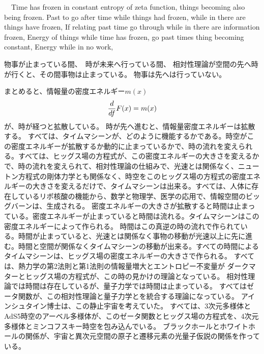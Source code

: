 \documentclass{jsarticle}
\begin{document}
\title{}
\author{}
\date{}
\maketitle
　Time has frozen in constant entropy of zeta function, things becoming also being frozen.
Past to go after time while things had frozen, while in there are things have frozen,
If relating past time go through while in there are information frozen,
Energy of things while time has frozen, go past times thing becoming constant,
Energy while in no work,

物事が止まっている間、　時が未来へ行っている間、
相対性理論が空間の先へ時が行くと、その間事物は止まっている。
物事は先へは行っていない。

まとめると、情報量の密度エネルギー$ m(x) $
$${d \over df}F(x)=m(x)$$
が、時が経つと拡散している。
時が先へ進むと、情報量密度エネルギーは拡散する。
すべては、タイムマシーンが、どのように機能するかである。時空がこの密度エネルギーが拡散するか動的に止まっているかで、時の流れを変えられる。すべては、ヒッグス場の方程式が、この密度エネルギーの大きさを変えるかで、時の流れを変えられて、相対性理論の仕組みで、光速とは関係なく、ニュートン方程式の剛体力学とも関係なく、時空をこのヒッグス場の方程式の密度エネルギーの大きさを変えるだけで、タイムマシーンは出来る。すべては、人体に存在しているリボ核酸の機能から、数学と物理学、医学の応用で、情報空間のビッグバーンは、生成される。
密度エネルギーの大きさが拡散すると時間は止まっている。密度エネルギーが止まっていると時間は流れる。タイムマシーンはこの密度エネルギーによって作られる。
時間はこの真逆の時の流れで作られている。時間が止まっていると、光速とは関係なく事物の移動が光速以上に先に進む。時間と空間が関係なくタイムマシーンの移動が出来る。すべての時間によるタイムマシーンは、ヒッグス場の密度エネルギーの大きさで作られる。
すべては、熱力学の第2法則と第1法則の情報量増大とエントロピー不変量が
ダークマターとヒッグス場の方程式が、この時の見かけの理論となっている。
相対性理論では時間は存在しているが、量子力学では時間は止まっている。
すべてはゼータ関数が、この相対性理論と量子力学とを統合する理論になっている。
アインシュタイン博士は、この静止宇宙を考えていた。
すべては、3次元多様体とAdS5時空のアーベル多様体が、このゼータ関数とヒッグス場の方程式を、4次元多様体とミンコフスキー時空を包み込んでいる。
ブラックホールとホワイトホールの関係が、宇宙と異次元空間の原子と遷移元素の光量子仮説の関係を作っている。
\end{document}
